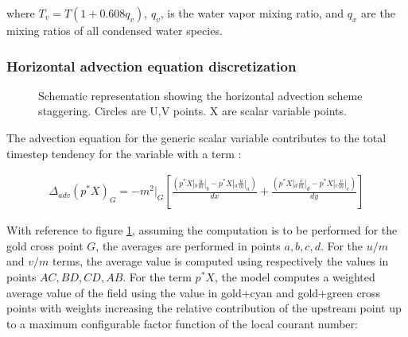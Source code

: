 where $T_v = T(1 + 0.608q_v)$, $q_v$, is the water vapor mixing ratio, and
$q_x$ are the mixing ratios of all condensed water species.

\subsubsection{Horizontal advection equation discretization}

\begin{figure}
\begin{center}
\caption{Schematic representation showing the horizontal advection
scheme staggering. Circles are U,V points. X are scalar variable points.}
\label{advection_grid}
\end{center}
\end{figure}

The advection equation for the generic scalar variable contributes to the total
timestep tendency for the variable with a term :

\begin{eqnarray}
\label{advection_equation_1}
\Delta_{adv} \left(p^* X\right)_{G} = -m^2|_G \left[ 
  \frac{\left( p^*X|_b \frac{u}{m}|_b-p^*X|_a \frac{u}{m}|_a \right)}{dx} +
  \frac{\left( p^*X|_d \frac{v}{m}|_d-p^*X|_c \frac{v}{m}|_c \right)}{dy}\right]
\end{eqnarray}

With reference to figure \ref{advection_grid}, assuming the computation
is to be performed for the gold cross point $G$, the averages are performed in
points $a,b,c,d$.
For the $u/m$ and $v/m$ terms, the average value is computed using respectively
the values in points $AC,BD,CD,AB$.
For the term $p^*X$, the model computes a weighted average value of the field
using the value in gold+cyan and gold+green cross points with weights
increasing the relative contribution of the upstream point up to a maximum
configurable factor function of the local courant number:

